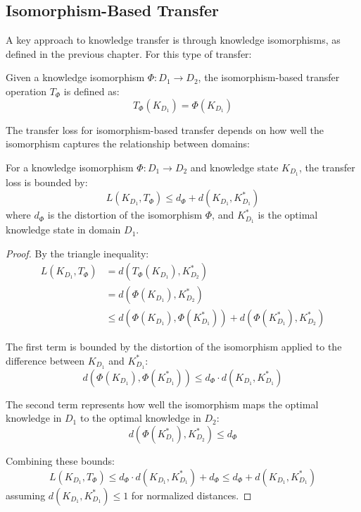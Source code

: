 \subsection{Isomorphism-Based Transfer}

A key approach to knowledge transfer is through knowledge isomorphisms, as defined in the previous chapter. For this type of transfer:

\begin{definition}
Given a knowledge isomorphism $\Phi: D_1 \to D_2$, the isomorphism-based transfer operation $T_{\Phi}$ is defined as:
\begin{equation}
T_{\Phi}(K_{D_1}) = \Phi(K_{D_1})
\end{equation}
\end{definition}

The transfer loss for isomorphism-based transfer depends on how well the isomorphism captures the relationship between domains:

\begin{theorem}
For a knowledge isomorphism $\Phi: D_1 \to D_2$ and knowledge state $K_{D_1}$, the transfer loss is bounded by:
\begin{equation}
L(K_{D_1}, T_{\Phi}) \leq d_{\Phi} + d(K_{D_1}, K_{D_1}^*)
\end{equation}
where $d_{\Phi}$ is the distortion of the isomorphism $\Phi$, and $K_{D_1}^*$ is the optimal knowledge state in domain $D_1$.
\end{theorem}

\begin{proof}
By the triangle inequality:
\begin{align}
L(K_{D_1}, T_{\Phi}) &= d(T_{\Phi}(K_{D_1}), K_{D_2}^*) \\
&= d(\Phi(K_{D_1}), K_{D_2}^*) \\
&\leq d(\Phi(K_{D_1}), \Phi(K_{D_1}^*)) + d(\Phi(K_{D_1}^*), K_{D_2}^*)
\end{align}

The first term is bounded by the distortion of the isomorphism applied to the difference between $K_{D_1}$ and $K_{D_1}^*$:
\begin{equation}
d(\Phi(K_{D_1}), \Phi(K_{D_1}^*)) \leq d_{\Phi} \cdot d(K_{D_1}, K_{D_1}^*)
\end{equation}

The second term represents how well the isomorphism maps the optimal knowledge in $D_1$ to the optimal knowledge in $D_2$:
\begin{equation}
d(\Phi(K_{D_1}^*), K_{D_2}^*) \leq d_{\Phi}
\end{equation}

Combining these bounds:
\begin{equation}
L(K_{D_1}, T_{\Phi}) \leq d_{\Phi} \cdot d(K_{D_1}, K_{D_1}^*) + d_{\Phi} \leq d_{\Phi} + d(K_{D_1}, K_{D_1}^*)
\end{equation}
assuming $d(K_{D_1}, K_{D_1}^*) \leq 1$ for normalized distances.
\end{proof}

